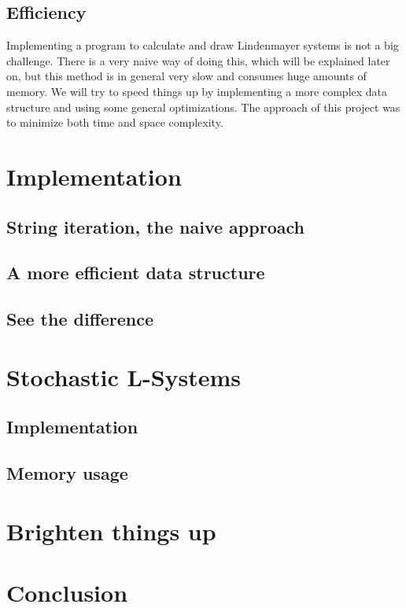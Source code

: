 \documentclass[11pt,a4paper]{article}
\begin{document}
\subsection{Efficiency} %
Implementing a program to calculate and draw Lindenmayer systems is not a big challenge. There is a very naive way of doing this, which will be explained later on, but this method is in general very slow and consumes huge amounts of memory. We will try to speed things up by implementing a more complex data structure and using some general optimizations. The approach of this project was to minimize both time and space complexity.

\section{Implementation}
\subsection{String iteration, the naive approach}
\subsection{A more efficient data structure} %
\subsection{See the difference} %

\section{Stochastic L-Systems} %
\subsection{Implementation}
\subsection{Memory usage}

\section{Brighten things up} %

\section{Conclusion}

\newpage
\begin{appendix}
\listoffigures
\end{appendix}
\end{document}
